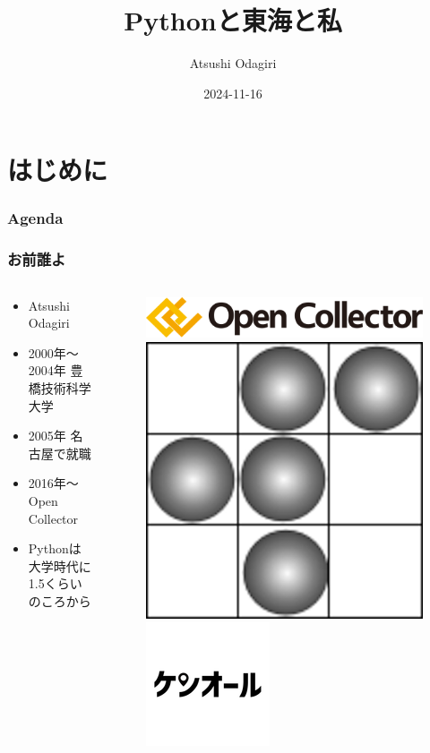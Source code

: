 \documentclass[aspectratio=169]{beamer}
\title{Pythonと東海と私}
\author{Atsushi Odagiri}
\date{2024-11-16}
\begin{document}
\section{はじめに}
\begin{frame}
\titlepage
\end{frame}

\begin{frame}
\frametitle{Agenda}
\tableofcontents
\end{frame}

\begin{frame}
\frametitle{お前誰よ}
\begin{columns}
\begin{column}{0.47\linewidth}
\begin{itemize}
\item Atsushi Odagiri
\item 2000年〜2004年 豊橋技術科学大学
\item 2005年 名古屋で就職
\item 2016年〜 Open Collector
\item Pythonは大学時代に1.5くらいのころから
\end{itemize}
\end{column}
\begin{column}{0.47\linewidth}
\begin{figure}[h]
\includegraphics[width=\linewidth]{oc-logo.png}
\includegraphics[width=0.47\linewidth]{r-penta512.png}
\includegraphics[width=0.47\linewidth]{kenall.png}
\end{figure}
\end{column}
\end{columns}
\end{frame}
\end{document}
